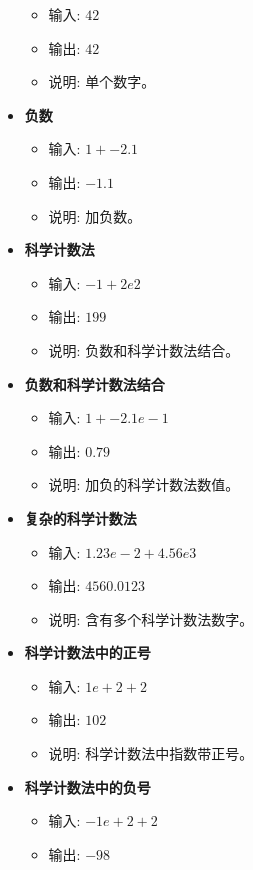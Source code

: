 \documentclass{article}
\begin{document}
\begin{itemize}
\begin{itemize}
        \item 输入: \(42\)
        \item 输出: \(42\)
        \item 说明: 单个数字。
    \end{itemize}
    \item \textbf{负数}
    \begin{itemize}
        \item 输入: \(1 + -2.1\)
        \item 输出: \(-1.1\)
        \item 说明: 加负数。
    \end{itemize}
    \item \textbf{科学计数法}
    \begin{itemize}
        \item 输入: \(-1 + 2e2\)
        \item 输出: \(199\)
        \item 说明: 负数和科学计数法结合。
    \end{itemize}
    \item \textbf{负数和科学计数法结合}
    \begin{itemize}
        \item 输入: \(1 + -2.1e-1\)
        \item 输出: \(0.79\)
        \item 说明: 加负的科学计数法数值。
    \end{itemize}
    \item \textbf{复杂的科学计数法}
    \begin{itemize}
        \item 输入: \(1.23e-2 + 4.56e3\)
        \item 输出: \(4560.0123\)
        \item 说明: 含有多个科学计数法数字。
    \end{itemize}
    \item \textbf{科学计数法中的正号}
    \begin{itemize}
        \item 输入: \(1e+2 + 2\)
        \item 输出: \(102\)
        \item 说明: 科学计数法中指数带正号。
    \end{itemize}
    \item \textbf{科学计数法中的负号}
    \begin{itemize}
        \item 输入: \(-1e+2 + 2\)
        \item 输出: \(-98\)

\end{itemize}
\end{itemize}
\end{document}
